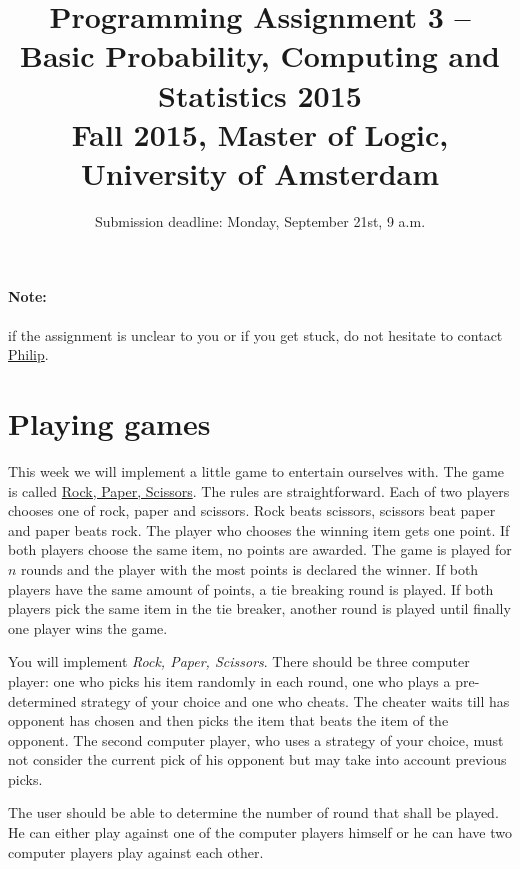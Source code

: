 \documentclass[11pt, leqno, a4paper]{article}
\title{Programming Assignment 3 -- Basic Probability, Computing and Statistics 2015 \\[2mm]
\large{Fall 2015, Master of Logic, University of Amsterdam}}
\author{}
\date{Submission deadline: Monday, September 21st, 9 a.m.}
\begin{document}
\maketitle

\paragraph{Note:} if the assignment is unclear to you or if you get stuck, do not hesitate to contact \href{mailto:P.Schulz@uva.nl}{Philip}.

\section{Playing games}\label{intro}
This week we will implement a little game to entertain ourselves with. The game is called \href{https://en.wikipedia.org/wiki/Rock-paper-scissors}{Rock, Paper, Scissors}. 
The rules are straightforward.
Each of two players chooses one of rock, paper and scissors. Rock beats scissors, scissors beat paper and paper beats rock. The player who chooses the winning
item gets one point. If both players choose the same item, no points are awarded. The game is played for $ n $ rounds and the player with the most points
is declared the winner. If both players have the same amount of points, a tie breaking round is played. If both players pick the same item in the tie breaker,
another round is played until finally one player wins the game.

You will implement \textit{Rock, Paper, Scissors}. There should be three computer player: one who picks his item randomly in each round, one who plays a 
pre-determined strategy of your choice and one who cheats. The cheater waits till has opponent has chosen and then picks the item that beats the item of the
opponent. The second computer player, who uses a strategy of your choice, must not consider the current pick of his opponent but may take into account previous picks.

The user should be able to determine the number of round that shall be played. He can either play against one of the computer players himself or he can have two
computer players play against each other.
\end{document}
